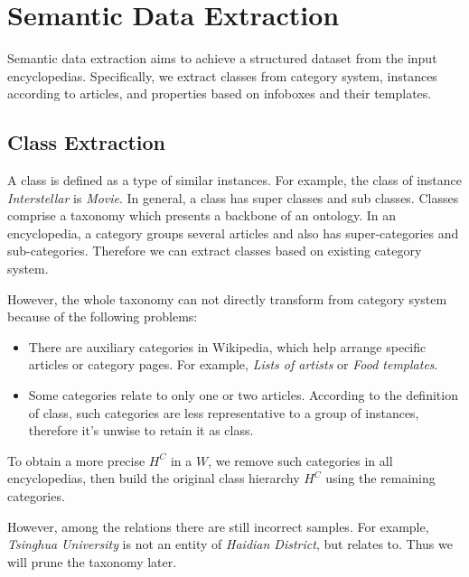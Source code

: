 \documentclass[runningheads,a4paper]{llncs}
\begin{document}
\section{Semantic Data Extraction}
\label{sec:dp}
Semantic data extraction aims to achieve a structured dataset from the input encyclopedias. Specifically, we extract classes from category system, instances according to articles, and properties based on infoboxes and their templates.

\subsection{Class Extraction}
\label{sec:ce}
A class is defined as a type of similar instances. For example, the class of instance \emph{Interstellar} is \emph{Movie}. In general, a class has super classes and sub classes. Classes comprise a taxonomy which presents a backbone of an ontology. In an encyclopedia, a category groups several articles and also has super-categories and sub-categories. Therefore we can extract classes based on existing category system.

However, the whole taxonomy can not directly transform from category system because of the following problems:
\begin{itemize}
    \item There are auxiliary categories in Wikipedia, which help arrange specific articles or category pages. For example, \emph{Lists of artists} or \emph{Food templates}.
    \item Some categories relate to only one or two articles. According to the definition of class, such categories are less representative to a group of instances, therefore it's unwise to retain it as class.
\end{itemize}

To obtain a more precise $H^C$ in a $W$, we remove such categories in all encyclopedias, then build the original class hierarchy $H^C$ using the remaining categories.

However, among the relations there are still incorrect samples. For example, \emph{Tsinghua University} is not an entity of \emph{Haidian District}, but relates to. Thus we will prune the taxonomy later.
\end{document}
